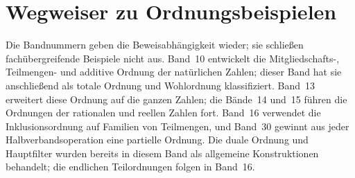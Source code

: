 \documentclass[main.tex]{subfiles}
\begin{document}
\chapter{Wegweiser zu Ordnungsbeispielen}

Die Bandnummern geben die Beweisabhängigkeit wieder; sie schließen
fachübergreifende Beispiele nicht aus. Band~10 entwickelt die
Mitgliedschafts-, Teilmengen- und additive Ordnung der natürlichen Zahlen;
dieser Band hat sie anschließend als totale Ordnung und Wohlordnung
klassifiziert. Band~13 erweitert diese Ordnung auf die ganzen Zahlen; die Bände~14 und~15
führen die Ordnungen der rationalen und reellen Zahlen fort. Band~16 verwendet
die Inklusionsordnung auf Familien von Teilmengen, und Band~30 gewinnt aus jeder
Halbverbandsoperation eine partielle Ordnung. Die duale Ordnung und
Hauptfilter wurden bereits in diesem Band als allgemeine Konstruktionen
behandelt; die endlichen Teilordnungen folgen in Band~16.
\end{document}
